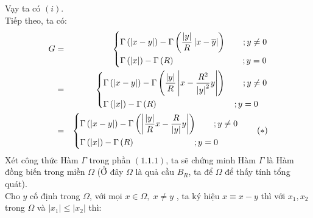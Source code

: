Vạy ta có $
\left( i \right)
$.\\
Tiếp theo, ta có:
\begin{eqnarray}
G &=& \left\{ \begin{gathered}
  \Gamma \left( {\left| {x - y} \right|} \right) - \Gamma \left( {\frac{{\left| y \right|}}
{R}\left| {x - \overline y } \right|} \right)\quad \quad ;y \ne 0 \hfill \\
  \Gamma \left( {\left| x \right|} \right) - \Gamma \left( R \right)\quad \quad \quad \quad \quad \quad \quad \quad ;y = 0 \hfill \\ 
\end{gathered}  \right.\nonumber\\
 &=& \left\{ \begin{gathered}
  \Gamma \left( {\left| {x - y} \right|} \right) - \Gamma \left( {\frac{{\left| y \right|}}
{R}\left| {x - \frac{{R^2 }}
{{\left| y \right|^2 }}y} \right|} \right)\quad \quad ;y \ne 0 \hfill \\
  \Gamma \left( {\left| x \right|} \right) - \Gamma \left( R \right)\quad \quad \quad \quad \quad \quad \quad \quad \quad ;y = 0 \hfill \\ 
\end{gathered}  \right.\nonumber\\
& = &\left\{ \begin{gathered}
  \Gamma \left( {\left| {x - y} \right|} \right) - \Gamma \left( {\left| {\frac{{\left| y \right|}}
{R}x - \frac{R}
{{\left| y \right|}}y} \right|} \right)\quad \quad ;y \ne 0 \hfill \\
  \Gamma \left( {\left| x \right|} \right) - \Gamma \left( R \right)\quad \quad \quad \quad \quad \quad \quad ;y = 0 \hfill \\ 
\end{gathered}  \right.\quad \quad \left( * \right) \nonumber
\end{eqnarray}
Xét công thức Hàm $\Gamma$ trong phần $
\left( {1.1.1} \right)$, ta sẽ chứng minh Hàm $\Gamma$ là Hàm đồng biến trong miền $\Omega$ (Ở đây $\Omega$ là quả cầu $B_R$, ta để $\Omega$ để thấy tính tổng quát).\\
Cho $y$ cố định trong $\Omega$, với mọi $
x \in \Omega ,\;x \ne y
$ , ta ký hiệu $
x \equiv x - y
$ thì với $
x_1 ,x_2 
$ trong $\Omega$ và $
\left| {x_1 } \right| \leqslant \left| {x_2 } \right|
$ thì:
